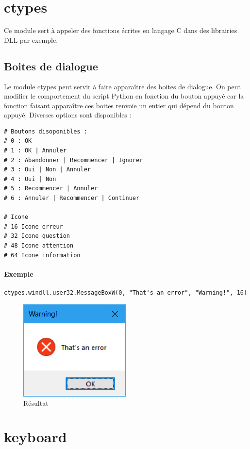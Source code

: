 \documentclass[a4paper, 10pt]{article}
\begin{document}
\section{ctypes}
 Ce module sert à appeler des fonctions écrites en langage C dans des librairies DLL par exemple.
\subsection{Boites de dialogue}
 Le module ctypes peut servir à faire apparaître des boites de dialogue. On peut modifier le comportement du script Python en fonction du bouton appuyé car la fonction faisant apparaître ces boites renvoie un entier qui dépend du bouton appuyé. Diverses options sont disponibles :
\begin{verbatim}
# Boutons disoponibles :
# 0 : OK
# 1 : OK | Annuler
# 2 : Abandonner | Recommencer | Ignorer
# 3 : Oui | Non | Annuler
# 4 : Oui | Non
# 5 : Recommencer | Annuler
# 6 : Annuler | Recommencer | Continuer

# Icone
# 16 Icone erreur
# 32 Icone question
# 48 Icone attention
# 64 Icone information
\end{verbatim}

\paragraph{Exemple}
\begin{verbatim}
ctypes.windll.user32.MessageBoxW(0, "That's an error", "Warning!", 16)
\end{verbatim}
\begin{figure}[h]
\begin{center}
\includegraphics[scale=0.5]{errorwindow.png}
\caption*{Résultat}
\end{center}
\end{figure}

\section{keyboard}
\end{document}
